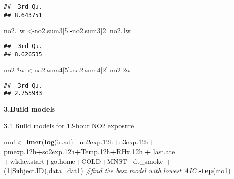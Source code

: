 \documentclass[12pt,]{article}
\newenvironment{Shaded}{\begin{snugshade}}{\end{snugshade}}
\newcommand{\CommentTok}[1]{\textcolor[rgb]{0.56,0.35,0.01}{\textit{#1}}}
\newcommand{\DataTypeTok}[1]{\textcolor[rgb]{0.13,0.29,0.53}{#1}}
\newcommand{\DecValTok}[1]{\textcolor[rgb]{0.00,0.00,0.81}{#1}}
\newcommand{\FloatTok}[1]{\textcolor[rgb]{0.00,0.00,0.81}{#1}}
\newcommand{\KeywordTok}[1]{\textcolor[rgb]{0.13,0.29,0.53}{\textbf{#1}}}
\newcommand{\NormalTok}[1]{#1}
\newcommand{\OperatorTok}[1]{\textcolor[rgb]{0.81,0.36,0.00}{\textbf{#1}}}
\newcommand{\StringTok}[1]{\textcolor[rgb]{0.31,0.60,0.02}{#1}}
\begin{document}
\begin{verbatim}
##  3rd Qu. 
## 8.643751
\end{verbatim}

\begin{Shaded}
\begin{Highlighting}[]
\NormalTok{no2}\FloatTok{.1}\NormalTok{w <-no2.sum3[}\DecValTok{5}\NormalTok{]}\OperatorTok{-}\NormalTok{no2.sum3[}\DecValTok{2}\NormalTok{]}
\NormalTok{no2}\FloatTok{.1}\NormalTok{w}
\end{Highlighting}
\end{Shaded}

\begin{verbatim}
##  3rd Qu. 
## 8.626535
\end{verbatim}

\begin{Shaded}
\begin{Highlighting}[]
\NormalTok{no2}\FloatTok{.2}\NormalTok{w <-no2.sum4[}\DecValTok{5}\NormalTok{]}\OperatorTok{-}\NormalTok{no2.sum4[}\DecValTok{2}\NormalTok{]}
\NormalTok{no2}\FloatTok{.2}\NormalTok{w}
\end{Highlighting}
\end{Shaded}

\begin{verbatim}
##  3rd Qu. 
## 2.755933
\end{verbatim}

\textbf{3.Build models}

3.1 Build models for 12-hour NO2 exposure

\begin{Shaded}
\begin{Highlighting}[]
\NormalTok{mo1<-}\StringTok{ }\KeywordTok{lmer}\NormalTok{(}\KeywordTok{log}\NormalTok{(is.ad) }\OperatorTok{~}\NormalTok{no2exp}\FloatTok{.12}\NormalTok{h}\OperatorTok{+}\NormalTok{o3exp}\FloatTok{.12}\NormalTok{h}\OperatorTok{+}\StringTok{ }\NormalTok{pmexp}\FloatTok{.12}\NormalTok{h}\OperatorTok{+}\NormalTok{so2exp}\FloatTok{.12}\NormalTok{h}\OperatorTok{+}\NormalTok{Temp}\FloatTok{.12}\NormalTok{h}\OperatorTok{+}\NormalTok{RHx}\FloatTok{.12}\NormalTok{h }\OperatorTok{+}\StringTok{ }\NormalTok{last.ate }\OperatorTok{+}\NormalTok{wkday.start}\OperatorTok{+}\NormalTok{go.home}\OperatorTok{+}\NormalTok{COLD}\OperatorTok{+}\NormalTok{MNST}\OperatorTok{+}\NormalTok{dt_smoke }\OperatorTok{+}\NormalTok{(}\DecValTok{1}\OperatorTok{|}\NormalTok{Subject.ID),}\DataTypeTok{data=}\NormalTok{dat1)}
\CommentTok{#find the best model with lowest AIC}
\KeywordTok{step}\NormalTok{(mo1)}
\end{Highlighting}
\end{Shaded}
\end{document}
